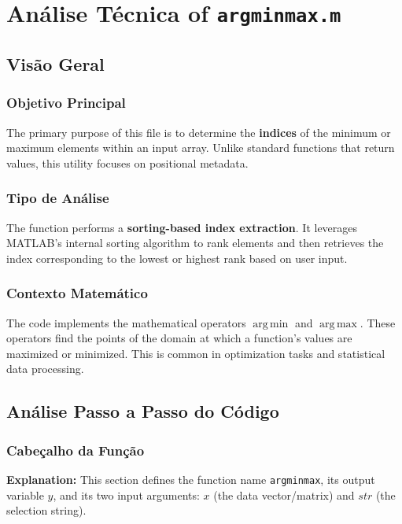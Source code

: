 
\chapter{Análise Técnica of \texttt{argminmax.m}}
\author{Software Engineering Analysis}
\date{\today}

\section{Visão Geral}

\subsection{Objetivo Principal}
The primary purpose of this file is to determine the \textbf{indices} of the minimum or maximum elements within an input array. Unlike standard functions that return values, this utility focuses on positional metadata.

\subsection{Tipo de Análise}
The function performs a \textbf{sorting-based index extraction}. It leverages MATLAB's internal sorting algorithm to rank elements and then retrieves the index corresponding to the lowest or highest rank based on user input.

\subsection{Contexto Matemático}
The code implements the mathematical operators $\operatorname{arg\,min}$ and $\operatorname{arg\,max}$. These operators find the points of the domain at which a function's values are maximized or minimized. This is common in optimization tasks and statistical data processing.

\section{Análise Passo a Passo do Código}

\subsection{Cabeçalho da Função}
\textbf{Explanation:} This section defines the function name \texttt{argminmax}, its output variable $y$, and its two input arguments: $x$ (the data vector/matrix) and $str$ (the selection string).

